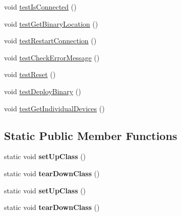 \begin{DoxyCompactItemize}
\item 
void \hyperlink{class_c_a_s_u_a_l_1_1communicationstools_1_1adb_1_1_a_d_b_tools_test_a0aad6314fea43a290aa12e7a23dbef33}{test\-Is\-Connected} ()
\item 
void \hyperlink{class_c_a_s_u_a_l_1_1communicationstools_1_1adb_1_1_a_d_b_tools_test_a6908ef2c62a43d76ffa171db28be51f1}{test\-Get\-Binary\-Location} ()
\item 
void \hyperlink{class_c_a_s_u_a_l_1_1communicationstools_1_1adb_1_1_a_d_b_tools_test_a7c80a3306b729cfb2976f03fd7257b2b}{test\-Restart\-Connection} ()
\item 
void \hyperlink{class_c_a_s_u_a_l_1_1communicationstools_1_1adb_1_1_a_d_b_tools_test_a61c60191f0f412d9f68363f025566311}{test\-Check\-Error\-Message} ()
\item 
void \hyperlink{class_c_a_s_u_a_l_1_1communicationstools_1_1adb_1_1_a_d_b_tools_test_a05bc7867067b538cebf764e3c9a66646}{test\-Reset} ()
\item 
void \hyperlink{class_c_a_s_u_a_l_1_1communicationstools_1_1adb_1_1_a_d_b_tools_test_a965c1f56f7c58ff8f5a0e7aa09182841}{test\-Deploy\-Binary} ()
\item 
void \hyperlink{class_c_a_s_u_a_l_1_1communicationstools_1_1adb_1_1_a_d_b_tools_test_a9e635bd5c3dbf6c6e408a9da1c355c41}{test\-Get\-Individual\-Devices} ()
\end{DoxyCompactItemize}
\subsection*{Static Public Member Functions}
\begin{DoxyCompactItemize}
\item 
\hypertarget{class_c_a_s_u_a_l_1_1communicationstools_1_1adb_1_1_a_d_b_tools_test_a7654924e4410e844b1a58557be1589dd}{static void {\bfseries set\-Up\-Class} ()}\label{class_c_a_s_u_a_l_1_1communicationstools_1_1adb_1_1_a_d_b_tools_test_a7654924e4410e844b1a58557be1589dd}

\item 
\hypertarget{class_c_a_s_u_a_l_1_1communicationstools_1_1adb_1_1_a_d_b_tools_test_af002000fe71a338bb3315d3b5d695144}{static void {\bfseries tear\-Down\-Class} ()}\label{class_c_a_s_u_a_l_1_1communicationstools_1_1adb_1_1_a_d_b_tools_test_af002000fe71a338bb3315d3b5d695144}

\item 
\hypertarget{class_c_a_s_u_a_l_1_1communicationstools_1_1adb_1_1_a_d_b_tools_test_a7654924e4410e844b1a58557be1589dd}{static void {\bfseries set\-Up\-Class} ()}\label{class_c_a_s_u_a_l_1_1communicationstools_1_1adb_1_1_a_d_b_tools_test_a7654924e4410e844b1a58557be1589dd}

\item 
\hypertarget{class_c_a_s_u_a_l_1_1communicationstools_1_1adb_1_1_a_d_b_tools_test_af002000fe71a338bb3315d3b5d695144}{static void {\bfseries tear\-Down\-Class} ()}\label{class_c_a_s_u_a_l_1_1communicationstools_1_1adb_1_1_a_d_b_tools_test_af002000fe71a338bb3315d3b5d695144}

\end{DoxyCompactItemize}


